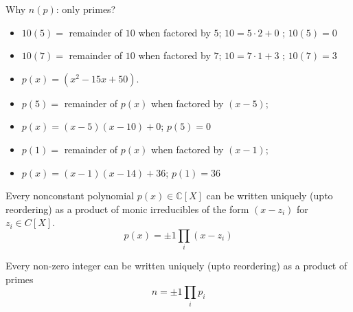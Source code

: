 \documentclass[8pt]{beamer}
\newcommand{\C}{\mathbb C}
\begin{document}
\begin{frame}{Why $n(p)$: only primes?}
\begin{itemize}
\item $10(5) = $ remainder of $10$ when factored by $5$; $10 = 5\cdot 2 + 0$ ; $10(5) = 0$
\item $10(7) = $ remainder of $10$ when factored by $7$; $10 = 7\cdot1 + 3$  ; $10(7) = 3$
\end{itemize}
\begin{itemize}
\item $p(x) = (x^2 - 15x + 50)$. \pause
\item $p(5) = $ \pause remainder of $p(x)$ when factored by $(x - 5)$; \pause 
\item $p(x) = (x-5)(x-10) + 0$; \pause $p(5) = 0$ \pause
\item $p(1) = $ \pause remainder of $p(x)$ when factored by $(x - 1)$; \pause 
\item $p(x) = (x-1)(x - 14) + 36$; \pause $p(1) = 36$ \pause
\end{itemize}
\pause

\begin{theorem} 
Every nonconstant polynomial $p(x) \in \C[X]$ can be written uniquely (upto reordering) as
a product of monic irreducibles of the form $(x - z_i)$ for $z_i \in C[X]$.
$$p(x) = \pm 1 \prod_i (x - z_i)$$
\end{theorem}

\pause

\begin{theorem} 
Every non-zero integer can be written uniquely (upto reordering) as a product of primes
$$n = \pm 1 \prod_i p_i$$
\end{theorem}

\end{frame}
\end{document}
